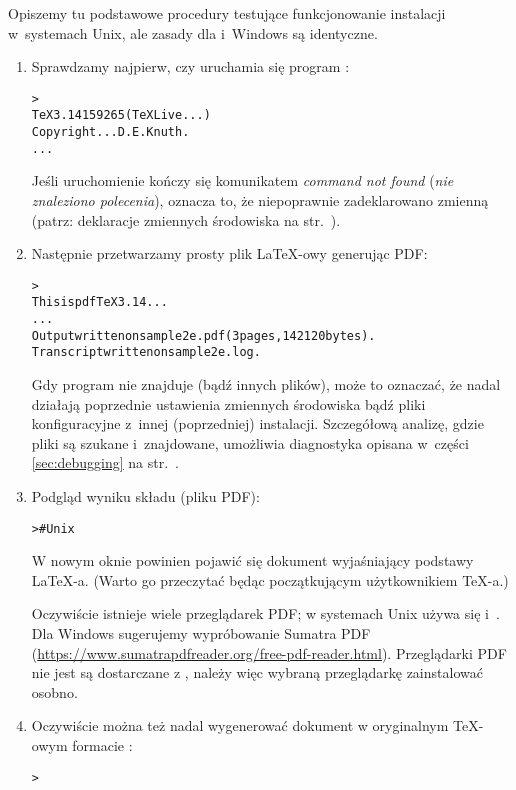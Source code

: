 \documentclass{article}
\begin{document}
Opiszemy tu podstawowe procedury testujące funkcjonowanie instalacji
w~systemach Unix, ale zasady dla \macOS{}  i~Windows są identyczne.


\begin{enumerate}
\item Sprawdzamy najpierw, czy uruchamia się  program :
\begin{alltt}
> 
TeX 3.14159265 (TeX Live ...)
Copyright ... D.E. Knuth.
...
\end{alltt}
Jeśli uruchomienie kończy się  komunikatem \emph{command not found}
(\emph{nie znaleziono polecenia}), oznacza to, że niepoprawnie
zadeklarowano zmienną  (patrz: deklaracje zmiennych
środowiska na str.~\pageref{sec:env}).

\item Następnie przetwarzamy prosty plik \LaTeX-owy generując PDF:
\begin{alltt}
> 
This is pdfTeX 3.14...
...
Output written on sample2e.pdf (3 pages, 142120 bytes).
Transcript written on sample2e.log.
\end{alltt}
Gdy program nie znajduje  (bądź innych
plików), może to oznaczać, że nadal działają poprzednie ustawienia
zmiennych środowiska bądź pliki konfiguracyjne z~innej (poprzedniej) instalacji.
Szczegółową analizę, gdzie pliki są szukane i~znajdowane,
umożliwia diagnostyka opisana w~części \ref{sec:debugging} na
str.~\pageref{sec:debugging}.
\item Podgląd wyniku składu (pliku PDF):
\begin{alltt}
 >     # Unix
\end{alltt}
W  nowym oknie powinien pojawić się dokument wyjaśniający podstawy \LaTeX-a.
(Warto go przeczytać będąc początkującym użytkownikiem \TeX-a.)

Oczywiście istnieje wiele przeglądarek PDF; w systemach Unix używa się
 i~. Dla Windows sugerujemy
wypróbowanie Sumatra PDF (\url{https://www.sumatrapdfreader.org/free-pdf-reader.html}).
Przeglądarki PDF nie jest są dostarczane z \TL{}, należy więc wybraną przeglądarkę  zainstalować osobno.

\item Oczywiście można też nadal wygenerować dokument w oryginalnym \TeX-owym formacie \dvi{}:
\begin{alltt}
> 
\end{alltt}


\end{enumerate}
\end{document}
